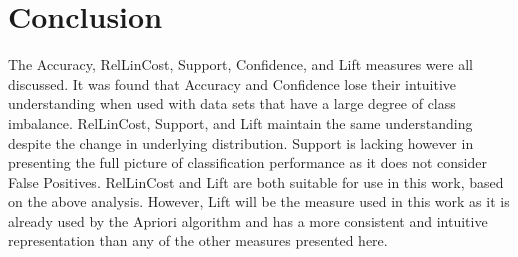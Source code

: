 \section{Conclusion}

The Accuracy, RelLinCost, Support, Confidence, and Lift measures were all discussed. It was found that Accuracy and Confidence lose their intuitive understanding when used with data sets that have a large degree of class imbalance. RelLinCost, Support, and Lift maintain the same understanding despite the change in underlying distribution. Support is lacking however in presenting the full picture of classification performance as it does not consider False Positives. RelLinCost and Lift are both suitable for use in this work, based on the above analysis. However, Lift will be the measure used in this work as it is already used by the Apriori algorithm and has a more consistent and intuitive representation than any of the other measures presented here.

